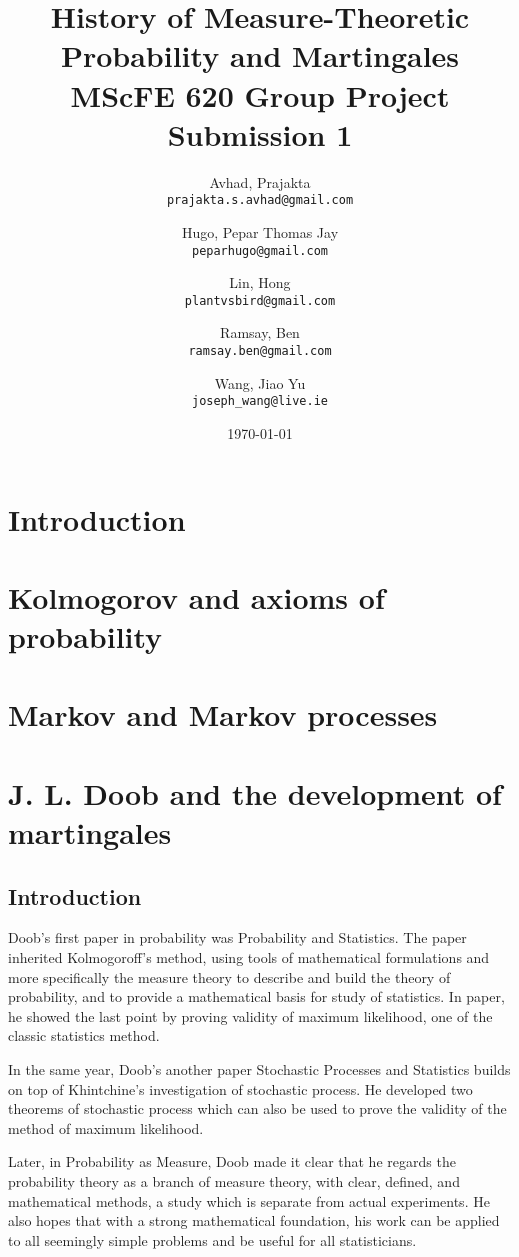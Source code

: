 \documentclass{article}
\title{History of Measure-Theoretic Probability and Martingales \\ MScFE 620 Group Project Submission 1}
\date{\today}
\author{
  Avhad, Prajakta\\
  \texttt{prajakta.s.avhad@gmail.com}
  \and
  Hugo, Pepar Thomas Jay\\
  \texttt{peparhugo@gmail.com}
  \and
  Lin, Hong\\
  \texttt{plantvsbird@gmail.com}
  \and
  Ramsay, Ben\\
  \texttt{ramsay.ben@gmail.com}
  \and
  Wang, Jiao Yu\\
  \texttt{joseph\_wang@live.ie}
}
\begin{document}
\maketitle  


\section{Introduction}

\section{Kolmogorov and axioms of probability}

\section{Markov and Markov processes}

\section{J. L. Doob and the development of martingales}
\subsection{Introduction}
Doob's first paper in probability was Probability and Statistics. The paper inherited Kolmogoroff's method, using tools of mathematical formulations and more specifically the measure theory to describe and build the theory of probability, and to provide a mathematical basis for study of statistics. In paper, he showed the last point by proving validity of maximum likelihood, one of the classic statistics method.

In the same year, Doob's another paper Stochastic Processes and Statistics builds on top of Khintchine's investigation of stochastic process. He developed two theorems of stochastic process which can also be used to prove the validity of the method of maximum likelihood.

Later, in Probability as Measure, Doob made it clear that he regards the probability theory as a branch of measure theory, with clear, defined, and mathematical methods, a study which is separate from actual experiments. He also hopes that with a strong mathematical foundation, his work can be applied to all seemingly simple problems and be useful for all statisticians. 
\end{document}
